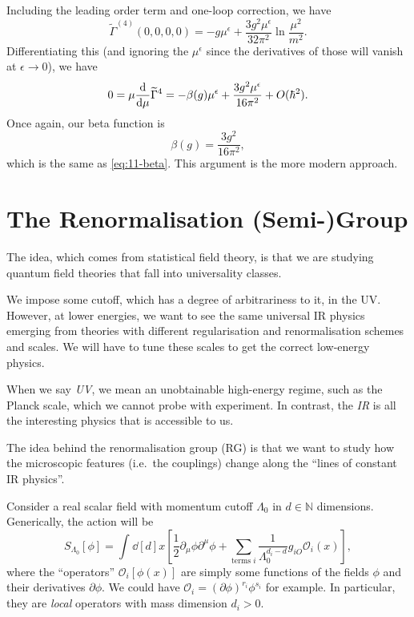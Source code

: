 Including the  leading order term and one-loop correction, we have
\begin{equation}
  \widetilde{\Gamma}^{(4)}(0,0,0,0) = - g \mu^\epsilon + \frac{3 g^2 \mu^\epsilon}{32 \pi^2} \ln \frac{\mu^2}{m^2}.
\end{equation}
Differentiating this (and ignoring the $\mu^\epsilon$ since the derivatives of those will vanish at $\epsilon \to 0$), we have
\begin{equation}
  0 = \mu \dv{\mu} \widetilde{\Gamma}^4 = - \beta(g) \mu^\epsilon + \frac{3 g^2 \mu^\epsilon}{16 \pi^2} + O(\hbar^2).
\end{equation}
Once again, our beta function is
\begin{equation}
  \beta(g) = \frac{3 g^2}{16 \pi^2},
\end{equation}
which is the same as \eqref{eq:11-beta}.
This argument is the more modern approach.

\chapter{The Renormalisation (Semi-)Group}%
\label{cha:the_renormalisation_semi_group}

The idea, which comes from statistical field theory, is that we are studying quantum field theories that fall into universality classes.

We impose some cutoff, which has a degree of arbitrariness to it, in the UV. However, at lower energies, we want to see the same universal IR physics emerging from theories with different regularisation and renormalisation schemes and scales.
We will have to tune these scales to get the correct low-energy physics.

\begin{remark}
  When we say \emph{UV}, we mean an unobtainable high-energy regime, such as the Planck scale, which we cannot probe with experiment.
  In contrast, the \emph{IR} is all the interesting physics that is accessible to us.
\end{remark}

The idea behind the renormalisation group (RG) is that we want to study how the microscopic features (i.e.~the couplings) change along the ``lines of constant IR physics''.

Consider a real scalar field with momentum cutoff $\Lambda_0$ in $d \in \mathbb{N}$ dimensions.
Generically, the action will be
\begin{equation}
  S_{\Lambda_0} [\phi] = \int_{}^{}\dd[d]{x} \left[ \frac{1}{2} \partial_{\mu} \phi \partial^{\mu} \phi + \sum_{\text{terms } i} \frac{1}{\Lambda_0^{d_i - d}} g_{iO} \mathcal{O}_i(x) \right],
\end{equation}
where the ``operators'' $\mathcal{O}_i[\phi(x)]$ are simply some functions of the fields $\phi$ and their derivatives $\partial \phi$.
We could have $ \mathcal{O}_i = (\partial \phi)^{r_i} \phi^{s_i}$ for example.
 In particular, they are \emph{local} operators with mass dimension $d_i > 0$. 

